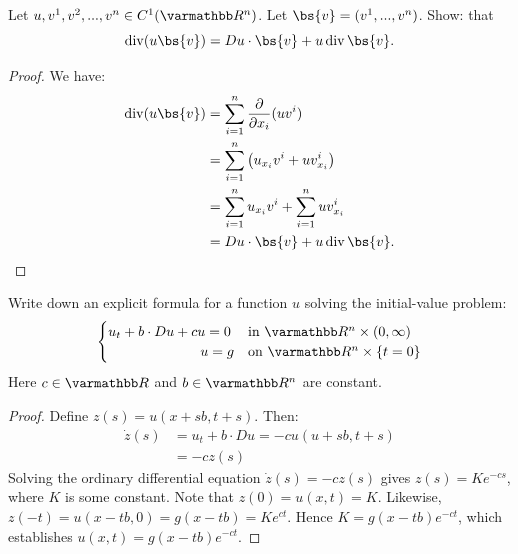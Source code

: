 \documentclass[10pt,oneside,openany]{memoir}
\begin{document}

\begin{problem}[manual-num={2}]
Let $u,v^1,v^2,...,v^n \in C^1(\bfR^n)$. Let $\bs{v} = (v^1,...,v^n)$. Show: that $$\Div( u \bs{v}) = Du \cdot \bs{v} + u \Div \bs{v}.$$
\end{problem}
    \begin{proof}
        We have:
            \begin{equation*}
            \begin{split}
                \Div(u \bs{v}) 
                & = \sum_{i = 1}^n \frac{\partial}{\partial x_i}(uv^i) \\
                & = \sum_{i = 1}^n \left(u_{x_i}v^i + u v_{x_i}^i\right) \\
                & = \sum_{i = 1}^n u_{x_i}v^i + \sum_{i = 1}^n u v_{x_i}^i \\
                & = Du \cdot \bs{v} + u \Div \bs{v}.  \qedhere
            \end{split}
            \end{equation*}
    \end{proof}

\begin{problem}[note={Evans \S 2.5 Problem 1},manual-num=3]
    Write down an explicit formula for a function $u$ solving the initial-value problem:
        \begin{equation*}
        \begin{split}
            \begin{cases}
            u_t + b \cdot Du + cu = 0 & \text{in }\bfR^n \times (0,\infty) \\
            \hspace{66pt}u = g& \text{on }\bfR^n \times \{t = 0\}
            \end{cases}
        \end{split}
        \end{equation*}
    Here $c \in \bfR$ and $b \in \bfR^n$ are constant.
\end{problem}
    \begin{proof}
        Define $z(s) = u(x+sb,t+s)$. Then:
            \begin{equation*}
            \begin{split}
                \dot{z}(s) 
                &= u_t + b \cdot Du = -c u(u+sb,t+s)\\
                & = -c z(s)
            \end{split}
            \end{equation*}
        Solving the ordinary differential equation $\dot{z}(s) = -c z(s)$ gives $z(s) = K e^{-cs}$, where $K$ is some constant. Note that $z(0) = u(x,t) = K$. Likewise, $z(-t) = u(x-tb,0) = g(x-tb) = Ke^{ct}$. Hence $K = g(x-tb)e^{-ct}$, which establishes $u(x,t) = g(x-tb)e^{-ct}$.
    \end{proof}
\end{document}
